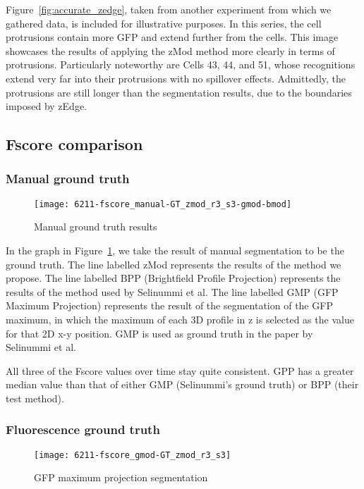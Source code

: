 Figure~\ref{fig:accurate_zedge}, taken from another experiment from which we gathered data, is included for illustrative purposes. In this series, the cell protrusions contain more GFP and extend further from the cells. This image showcases the results of applying the zMod method more clearly in terms of protrusions. Particularly noteworthy are Cells 43, 44, and 51, whose recognitions extend very far into their protrusions with no spillover effects. Admittedly, the protrusions are still longer than the segmentation results, due to the boundaries imposed by zEdge.

\subsection{Fscore comparison}

\subsubsection{Manual ground truth}

\begin{figure}[htbp!]
\centering
\texttt{[image: 6211-fscore\_manual-GT\_zmod\_r3\_s3-gmod-bmod]}
\caption{Manual ground truth results}
\label{fig:manual_ground}
\end{figure}

In the graph in Figure~\ref{fig:manual_ground}, we take the result of manual segmentation to be the ground truth. The line labelled zMod represents the results of the method we propose. The line labelled BPP (Brightfield Profile Projection) represents the results of the method used by Selinummi et al. The line labelled GMP (GFP Maximum Projection) represents the result of the segmentation of the GFP maximum, in which the maximum of each 3D profile in z is selected as the value for that 2D x-y position. GMP is used as ground truth in the paper by Selinummi et al.

All three of the Fscore values over time stay quite consistent. GPP has a greater median value than that of either GMP (Selinummi's ground truth) or BPP (their test method).

\subsubsection{Fluorescence ground truth}

\begin{figure}[htbp!]
\centering
\texttt{[image: 6211-fscore\_gmod-GT\_zmod\_r3\_s3]}
\caption{GFP maximum projection segmentation}
\label{fig:gfp_maximum}
\end{figure}

